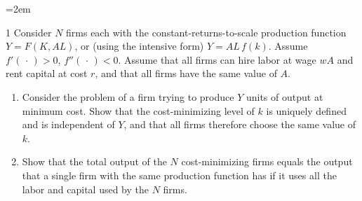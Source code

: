 \emergencystretch=2em
\newcommand{\rckmotion}[4]{%
    \fill[color=black!72] (#1,#2) circle (1.25pt);
    \draw[->,semithick,color=black!72] (#1,#2)--++(#3,#4);
}

\begin{problem}{1}
Consider \(N\) firms each with the constant-returns-to-scale production function \(Y=F\left(K,AL\right)\), or (using the intensive form) \(Y=AL\,f\left(k\right)\). Assume \(f'\left(\,\cdot\,\right)>0\), \(f''\left(\,\cdot\,\right)<0\). Assume that all firms can hire labor at wage \(wA\) and rent capital at cost \(r\), and that all firms have the same value of \(A\).
\begin{enumerate}[label=(\alph*)]
    \item Consider the problem of a firm trying to produce \(Y\) units of output at minimum cost. Show that the cost-minimizing level of \(k\) is uniquely defined and is independent of \(Y\), and that all firms therefore choose the same value of \(k\).
    \item Show that the total output of the \(N\) cost-minimizing firms equals the output that a single firm with the same production function has if it uses all the labor and capital used by the \(N\) firms.
\end{enumerate}
\end{problem}

